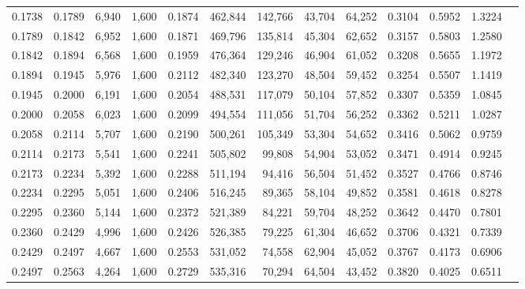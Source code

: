 \begin{tabular}{rrrrrrrrrrrrr}
0.1738 & 0.1789 &  6,940 & 1,600 &                                     0.1874 & 462,844 & 142,766 &  43,704 &  64,252 & 0.3104 & 0.5952 & 1.3224 \\
0.1789 & 0.1842 &  6,952 & 1,600 &                                     0.1871 & 469,796 & 135,814 &  45,304 &  62,652 & 0.3157 & 0.5803 & 1.2580 \\
0.1842 & 0.1894 &  6,568 & 1,600 &                                     0.1959 & 476,364 & 129,246 &  46,904 &  61,052 & 0.3208 & 0.5655 & 1.1972 \\
0.1894 & 0.1945 &  5,976 & 1,600 &                                     0.2112 & 482,340 & 123,270 &  48,504 &  59,452 & 0.3254 & 0.5507 & 1.1419 \\
0.1945 & 0.2000 &  6,191 & 1,600 &                                     0.2054 & 488,531 & 117,079 &  50,104 &  57,852 & 0.3307 & 0.5359 & 1.0845 \\
0.2000 & 0.2058 &  6,023 & 1,600 &                                     0.2099 & 494,554 & 111,056 &  51,704 &  56,252 & 0.3362 & 0.5211 & 1.0287 \\
0.2058 & 0.2114 &  5,707 & 1,600 &                                     0.2190 & 500,261 & 105,349 &  53,304 &  54,652 & 0.3416 & 0.5062 & 0.9759 \\
0.2114 & 0.2173 &  5,541 & 1,600 &                                     0.2241 & 505,802 &  99,808 &  54,904 &  53,052 & 0.3471 & 0.4914 & 0.9245 \\
0.2173 & 0.2234 &  5,392 & 1,600 &                                     0.2288 & 511,194 &  94,416 &  56,504 &  51,452 & 0.3527 & 0.4766 & 0.8746 \\
0.2234 & 0.2295 &  5,051 & 1,600 &                                     0.2406 & 516,245 &  89,365 &  58,104 &  49,852 & 0.3581 & 0.4618 & 0.8278 \\
0.2295 & 0.2360 &  5,144 & 1,600 &                                     0.2372 & 521,389 &  84,221 &  59,704 &  48,252 & 0.3642 & 0.4470 & 0.7801 \\
0.2360 & 0.2429 &  4,996 & 1,600 &                                     0.2426 & 526,385 &  79,225 &  61,304 &  46,652 & 0.3706 & 0.4321 & 0.7339 \\
0.2429 & 0.2497 &  4,667 & 1,600 &                                     0.2553 & 531,052 &  74,558 &  62,904 &  45,052 & 0.3767 & 0.4173 & 0.6906 \\
0.2497 & 0.2563 &  4,264 & 1,600 &                                     0.2729 & 535,316 &  70,294 &  64,504 &  43,452 & 0.3820 & 0.4025 & 0.6511 \\

\end{tabular}

